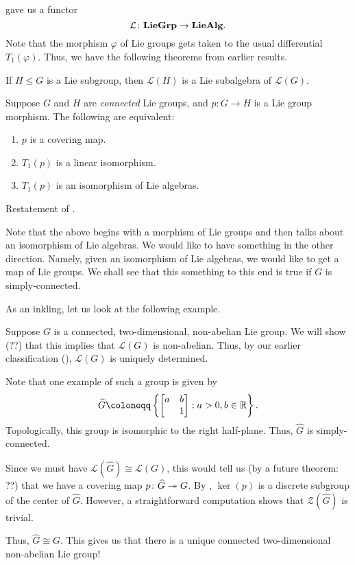 \documentclass[12pt]{article}
\begin{document}
 gave us a functor
\begin{equation*} 
	\mathcal{L} \colon \mathbf{LieGrp} \to \mathbf{LieAlg}.
\end{equation*}
Note that the morphism $\varphi$ of Lie groups gets taken to the usual differential $T_{1}(\varphi)$. 
Thus, we have the following theorems from earlier results.

\begin{thm}
	If $H \le G$ is a Lie subgroup, then $\mathcal{L}(H)$ is a Lie subalgebra of $\mathcal{L}(G)$.
\end{thm}

\begin{thm}
	Suppose $G$ and $H$ are \emph{connected} Lie groups, and $p \colon G \to H$ is a Lie group morphism. The following are equivalent:
	\begin{enumerate}[label=(\alph*)]
		\item $p$ is a covering map.
		\item $T_{1}(p)$ is a linear isomorphism.
		\item $T_{1}(p)$ is an isomorphism of Lie algebras.
	\end{enumerate}
\end{thm}
\begin{sketch}
	Restatement of .
\end{sketch}

Note that the above begins with a morphism of Lie groups and then talks about an isomorphism of Lie algebras. 
We would like to have something in the other direction. 
Namely, given an isomorphism of Lie algebras, we would like to get a map of Lie groups. 
We shall see that this something to this end is true if $G$ is simply-connected.

As an inkling, let us look at the following example.
\begin{ex}
	Suppose $G$ is a connected, two-dimensional, non-abelian Lie group. 
	We will show (??) that this implies that $\mathcal{L}(G)$ is non-abelian. 
	Thus, by our earlier classification (), $\mathcal{L}(G)$ is uniquely determined. 

	Note that one example of such a group is given by
	\begin{equation*} 
		\widehat{G} \coloneqq \left\{\two{a}{b}{}{1} : a > 0, b \in \mathbb{R}\right\}.
	\end{equation*}
	Topologically, this group is isomorphic to the right half-plane. 
	Thus, $\widehat{G}$ is simply-connected.

	Since we must have $\mathcal{L}(\widehat{G}) \cong \mathcal{L}(G)$, this would tell us (by a future theorem: ??) that we have a covering map $p \colon \widehat{G} \twoheadrightarrow G$. 
	By , $\ker(p)$ is a discrete subgroup of the center of $\widehat{G}$. 
	However, a straightforward computation shows that $\mathcal{Z}(\widehat{G})$ is trivial. 

	Thus, $\widehat{G} \cong G$. This gives us that there is a unique connected two-dimensional non-abelian Lie group!
\end{ex}
\end{document}

